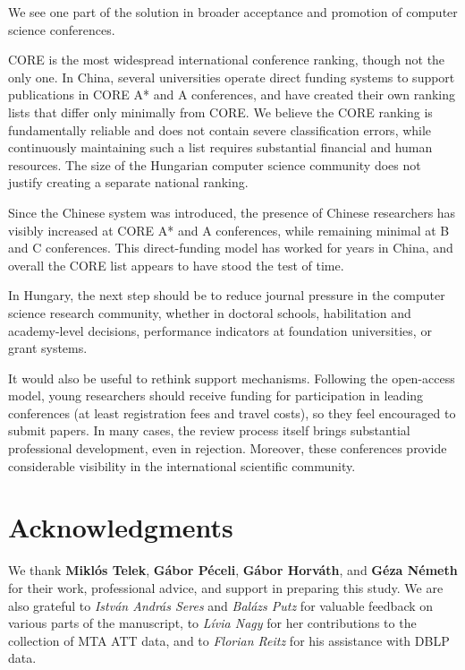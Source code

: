 \documentclass[12pt,a4paper]{article}
\begin{document}
We see one part of the solution in broader acceptance and promotion of computer science conferences.

CORE is the most widespread international conference ranking, though not the only one. In China, several universities operate direct funding systems to support publications in CORE A\!* and A conferences, and have created their own ranking lists that differ only minimally from CORE. We believe the CORE ranking is fundamentally reliable and does not contain severe classification errors, while continuously maintaining such a list requires substantial financial and human resources. The size of the Hungarian computer science community does not justify creating a separate national ranking.

Since the Chinese system was introduced, the presence of Chinese researchers has visibly increased at CORE A\!* and A conferences, while remaining minimal at B and C conferences. This direct-funding model has worked for years in China, and overall the CORE list appears to have stood the test of time.

In Hungary, the next step should be to reduce journal pressure in the computer science research community, whether in doctoral schools, habilitation and academy-level decisions, performance indicators at foundation universities, or grant systems.

It would also be useful to rethink support mechanisms. Following the open-access model, young researchers should receive funding for participation in leading conferences (at least registration fees and travel costs), so they feel encouraged to submit papers. In many cases, the review process itself brings substantial professional development, even in rejection. Moreover, these conferences provide considerable visibility in the international scientific community.

\section{Acknowledgments}

We thank \textbf{Miklós Telek}, \textbf{Gábor Péceli}, \textbf{Gábor Horváth}, and \textbf{Géza Németh} for their work, professional advice, and support in preparing this study. We are also grateful to \textit{István András Seres} and \textit{Balázs Putz} for valuable feedback on various parts of the manuscript, to \textit{Lívia Nagy} for her contributions to the collection of MTA ATT data, and to \textit{Florian Reitz} for his assistance with DBLP data.
\end{document}
